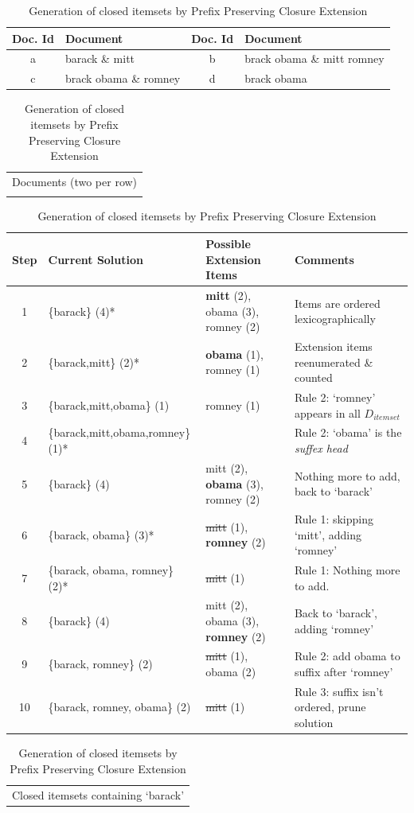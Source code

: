 \documentclass{sig-alternate}
\begin{document}
\begin{table}
\centering
\begin{tabular}{|c|p{5cm}||c|p{5cm}|} \hline
Doc. Id & Document & Doc. Id & Document\\\hline
a& barack \& mitt & b & brack obama \& mitt romney  \\\hline
c& brack obama \& romney & d & brack obama  \\\hline
\end{tabular}
\begin{tabular}{c}
Documents (two per row)\\\\
\end{tabular}
\begin{tabular}{|c|p{4.5cm}|p{5cm}|p{6cm}|} \hline
Step&Current Solution&Possible Extension Items&Comments\\ \hline
1& \{barack\} (4)* & \textbf{mitt} (2), obama (3), romney (2) & Items are ordered lexicographically\\ \hline
2& \{barack,mitt\} (2)* & \textbf{obama} (1), romney (1) & Extension items reenumerated \& counted\\ \hline
3 & \{barack,mitt,obama\} (1) & romney (1)                       & Rule 2: `romney' appears in all $D_{itemset}$\\\hline
4 & \{barack,mitt,obama,romney\}(1)* & & Rule 2: `obama'  is the \emph{suffex head} \\\hline
5 & \{barack\} (4) & mitt (2), \textbf{obama} (3), romney (2) & Nothing more to add, back to `barack' \\\hline
6 & \{barack, obama\} (3)* & \sout{mitt} (1), \textbf{romney} (2) & Rule 1: skipping `mitt', adding `romney' \\\hline
7 & \{barack, obama, romney\} (2)* & \sout{mitt} (1) & Rule 1: Nothing more to add. \\\hline
8 & \{barack\} (4) & mitt (2), obama (3), \textbf{romney} (2) & Back to `barack', adding `romney' \\\hline
9 & \{barack, romney\} (2) &  \sout{mitt} (1), obama (2) & Rule 2: add obama to suffix after `romney' \\\hline
10 & \{barack, romney, obama\} (2) &  \sout{mitt} (1)  & Rule 3: suffix isn't ordered, prune solution\\\hline

\end{tabular}
\begin{tabular}{c}
Closed itemsets containing `barack'
\end{tabular}
\caption{Generation of closed itemsets by Prefix Preserving Closure Extension}
\label{table:PPCExample}
\end{table}
\end{document}
